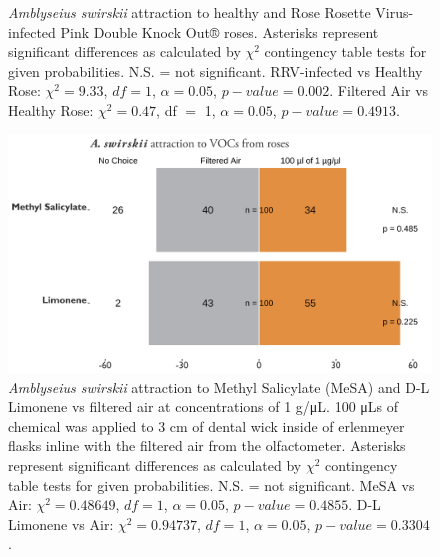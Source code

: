 \documentclass{ufdissertation}[overrideChapters] %
\begin{document}
{\begin{figure}
{}

\caption[\textit{Amblyseius swirskii} attraction to healthy and Rose Rosette Virus-infected Pink Double Knock Out® roses]{\textit{Amblyseius swirskii} attraction to healthy and Rose Rosette Virus-infected Pink Double Knock Out® roses. Asterisks represent significant differences as calculated by $\chi^2$ contingency table tests for given probabilities. N.S. = not significant. RRV-infected vs Healthy Rose: $\chi^2 = 9.33$, $df = 1$, $\alpha = 0.05$, $p-value = 0.002$. Filtered Air vs Healthy Rose: $\chi^2 = 0.47$, df $=$ 1, $\alpha = 0.05$, $p-value = 0.4913$.}\label{fig:aswir-rrd}
\end{figure}
\begin{figure}

{\centering \includegraphics[width=1\linewidth]{figure/rrv_graph_olfact_vocs} 

}

\caption[\textit{Amblyseius swirskii} attraction to Methyl Salicylate (MeSA) and D-L Limonene vs filtered air]{\textit{Amblyseius swirskii} attraction to Methyl Salicylate (MeSA) and D-L Limonene vs filtered air at concentrations of 1 g/\si{\micro\liter}. 100 \si{\micro\liter}s of chemical was applied to 3 cm of dental wick inside of erlenmeyer flasks inline with the filtered air from the olfactometer. Asterisks represent significant differences as calculated by $\chi^2$ contingency table tests for given probabilities. N.S. = not significant. MeSA vs Air: $\chi^2 = 0.48649$, $df = 1$, $\alpha = 0.05$, $p-value = 0.4855$. D-L Limonene vs Air: $\chi^2 = 0.94737$, $df = 1$, $\alpha = 0.05$, $p-value = 0.3304$.}\label{fig:aswir-mesa-lim}
\end{figure}
\begin{figure}


\end{figure}}
\end{document}

